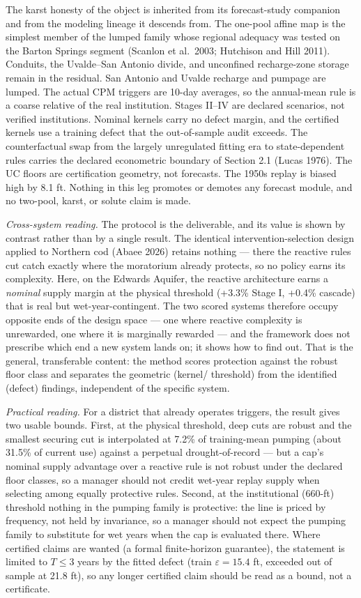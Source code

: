 \documentclass[11pt]{article}
\begin{document}
The karst honesty of the object is inherited from its forecast-study
companion and from the modeling lineage it descends from. The one-pool
affine map is the simplest member of the lumped family whose regional
adequacy was tested on the Barton Springs segment (Scanlon et al.~2003;
Hutchison and Hill 2011). Conduits, the Uvalde--San Antonio divide, and
unconfined recharge-zone storage remain in the residual. San Antonio and
Uvalde recharge and pumpage are lumped. The actual CPM triggers are
10-day averages, so the annual-mean rule is a coarse relative of the
real institution. Stages II--IV are declared scenarios, not verified
institutions. Nominal kernels carry no defect margin, and the certified
kernels use a training defect that the out-of-sample audit exceeds. The
counterfactual swap from the largely unregulated fitting era to
state-dependent rules carries the declared econometric boundary of
Section 2.1 (Lucas 1976). The UC floors are certification geometry, not
forecasts. The 1950s replay is biased high by 8.1 ft. Nothing in this
leg promotes or demotes any forecast module, and no two-pool, karst, or
solute claim is made.

\emph{Cross-system reading.} The protocol is the deliverable, and its
value is shown by contrast rather than by a single result. The identical
intervention-selection design applied to Northern cod (Abaee 2026)
retains nothing --- there the reactive rules cut catch exactly where the
moratorium already protects, so no policy earns its complexity. Here, on
the Edwards Aquifer, the reactive architecture earns a \emph{nominal}
supply margin at the physical threshold (+3.3\% Stage I, +0.4\% cascade)
that is real but wet-year-contingent. The two scored systems therefore
occupy opposite ends of the design space --- one where reactive
complexity is unrewarded, one where it is marginally rewarded --- and the
framework does not prescribe which end a new system lands on; it shows
how to find out. That is the general, transferable content: the method
scores protection against the robust floor class and separates the
geometric (kernel/ threshold) from the identified (defect) findings,
independent of the specific system.

\emph{Practical reading.} For a district that already operates triggers,
the result gives two usable bounds. First, at the physical threshold,
deep cuts are robust and the smallest securing cut is interpolated at
7.2\% of training-mean pumping (about 31.5\% of current use) against a
perpetual drought-of-record --- but a cap's nominal supply advantage over
a reactive rule is not robust under the declared floor classes, so a
manager should not credit wet-year replay supply when selecting among
equally protective rules. Second, at the institutional (660-ft) threshold
nothing in the pumping family is protective: the line is priced by
frequency, not held by invariance, so a manager should not expect the
pumping family to substitute for wet years when the cap is evaluated
there. Where certified claims are wanted (a formal finite-horizon
guarantee), the statement is limited to $T \le 3$ years by the fitted
defect (train $\varepsilon = 15.4$ ft, exceeded out of sample at 21.8 ft),
so any longer certified claim should be read as a bound, not a
certificate.
\end{document}
